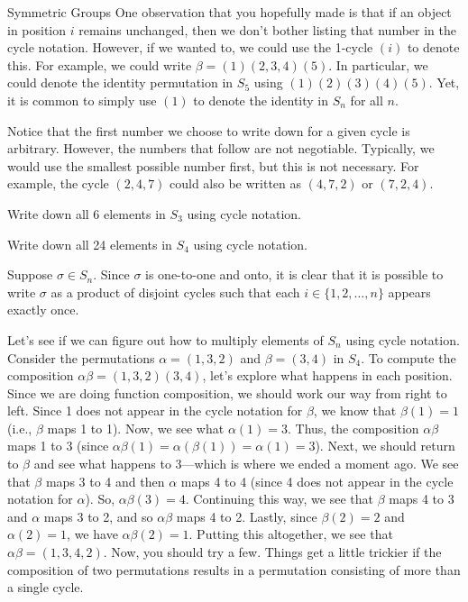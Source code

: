 \begin{section}{Symmetric Groups}
One observation that you hopefully made is that if an object in position $i$ remains unchanged, then we don't bother listing that number in the cycle notation.  However, if we wanted to, we could use the 1-cycle $(i)$ to denote this.  For example, we could write $\beta=(1)(2,3,4)(5)$.  In particular, we could denote the identity permutation in $S_5$ using $(1)(2)(3)(4)(5)$.  Yet, it is common to simply use $(1)$ to denote the identity in $S_n$ for all $n$.

Notice that the first number we choose to write down for a given cycle is arbitrary.  However, the numbers that follow are not negotiable.  Typically, we would use the smallest possible number first, but this is not necessary.  For example, the cycle $(2,4,7)$ could also be written as $(4,7,2)$ or $(7,2,4)$.

\begin{problem}\label{prob:S3-2}
Write down all 6 elements in $S_3$ using cycle notation.
\end{problem}

\begin{problem}\label{prob:S4}
Write down all 24 elements in $S_4$ using cycle notation.
\end{problem}

Suppose $\sigma\in S_n$.  Since $\sigma$ is one-to-one and onto, it is clear that it is possible to write $\sigma$ as a product of disjoint cycles such that each $i\in\{1,2,\ldots, n\}$ appears exactly once.

Let's see if we can figure out how to multiply elements of $S_n$ using cycle notation.  Consider the permutations $\alpha=(1,3,2)$ and $\beta=(3,4)$ in $S_4$.  To compute the composition $\alpha\beta=(1,3,2)(3,4)$, let's explore what happens in each position.  Since we are doing function composition, we should work our way from right to left.  Since 1 does not appear in the cycle notation for $\beta$, we know that $\beta(1)=1$ (i.e., $\beta$ maps 1 to 1).  Now, we see what $\alpha(1)=3$.  Thus, the composition $\alpha\beta$ maps 1 to 3 (since $\alpha\beta(1)=\alpha(\beta(1))=\alpha(1)=3$).  Next, we should return to $\beta$ and see what happens to 3---which is where we ended a moment ago.  We see that $\beta$ maps 3 to 4 and then $\alpha$ maps 4 to 4 (since 4 does not appear in the cycle notation for $\alpha$).  So, $\alpha\beta(3)=4$.  Continuing this way, we see that $\beta$ maps 4 to 3 and $\alpha$ maps 3 to 2, and so $\alpha\beta$ maps 4 to 2.  Lastly, since $\beta(2)=2$ and $\alpha(2)=1$, we have $\alpha\beta(2)=1$.  Putting this altogether, we see that $\alpha\beta=(1,3,4,2)$.  Now, you should try a few.  Things get a little trickier if the composition of two permutations results in a permutation consisting of more than a single cycle.


\end{section}
